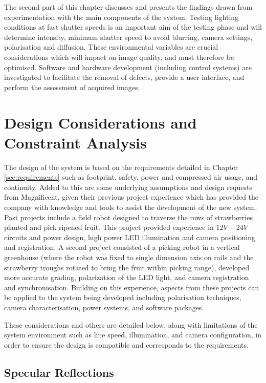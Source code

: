 \documentclass[fleqn,twoside,12pt]{report}
\begin{document}
The second part of this chapter discusses and presents the findings drawn from experimentation with the main components of the system. Testing lighting conditions at fast shutter speeds is an important aim of the testing phase and will determine intensity, minimum shutter speed to avoid blurring, camera settings, polarisation and diffusion. These environmental variables are crucial considerations which will impact on image quality, and must therefore be optimised. Software and hardware development (including control systems) are investigated to facilitate the removal of defects, provide a user interface, and perform the assessment of acquired images.


\section{Design Considerations and Constraint Analysis}
\label{sec:challenges}


The design of the system is based on the requirements detailed in Chapter \ref{sec:requirements} such as footprint, safety, power and compressed air usage, and continuity. Added to this are some underlying assumptions and design requests from Magnificent, given their previous project experience which has provided the company with knowledge and tools to assist the development of the new system. Past projects include a field robot designed to traverse the rows of strawberries planted and pick ripened fruit. This project provided experience in $12V-24V$ circuits and power design, high power LED illumination and camera positioning and registration. A second project consisted of a picking robot in a vertical greenhouse (where the robot was fixed to single dimension axis on rails and the strawberry troughs rotated to bring the fruit within picking range), developed more accurate grading, polarization of the LED light, and camera registration and synchronisation. Building on this experience, aspects from these projects can be applied to the system being developed including polarisation techniques, camera characterisation, power systems, and software packages.

These considerations and others are detailed below, along with limitations of the system environment such as line speed, illumination, and camera configuration, in order to ensure the design is compatible and corresponds to the requirements. 


\subsection{Specular Reflections}
\end{document}
